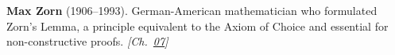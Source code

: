 \textbf{Max Zorn} (1906–1993). German-American mathematician who formulated Zorn's Lemma, a principle equivalent to the Axiom of Choice and essential for non-constructive proofs. \emph{[Ch.~\hyperref[ch:billiardsconicsporism]{07}]}

